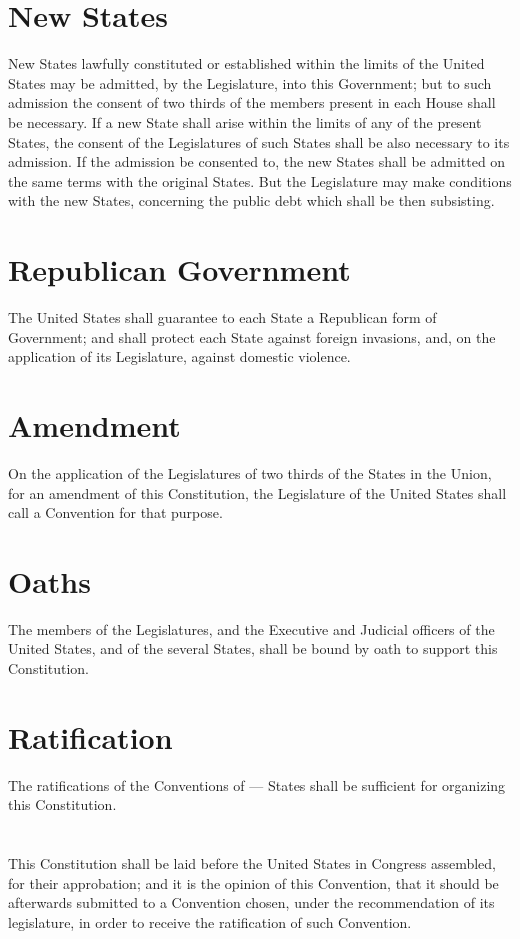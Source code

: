 \documentclass{constitution}
\begin{document}
\chapter{New States}
New States lawfully constituted or established within the limits of the United States may be admitted, by the Legislature, into this Government;
but to such admission the consent of two thirds of the members present in each House shall be necessary.
If a new State shall arise within the limits of any of the present States,
the consent of the Legislatures of such States shall be also necessary to its admission.
If the admission be consented to, the new States shall be admitted on the same terms with the original States.
But the Legislature may make conditions with the new States, concerning the public debt which shall be then subsisting.

\chapter{Republican Government}
The United States shall guarantee to each State a Republican form of Government;
and shall protect each State against foreign invasions,
and, on the application of its Legislature, against domestic violence.

\chapter{Amendment}
On the application of the Legislatures of two thirds of the States in the Union, for an amendment of this Constitution,
the Legislature of the United States shall call a Convention for that purpose.

\chapter{Oaths}
The members of the Legislatures, and the Executive and Judicial officers of the United States, and of the several States,
shall be bound by oath to support this Constitution.

\chapter{Ratification}
The ratifications of the Conventions of — States shall be sufficient for organizing this Constitution.

\chapter{}
This Constitution shall be laid before the United States in Congress assembled, for their approbation;
and it is the opinion of this Convention, that it should be afterwards submitted to a Convention chosen, under the recommendation of its legislature, in order to receive the ratification of such Convention.
\end{document}
